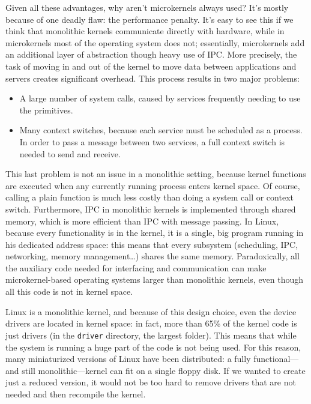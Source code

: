 Given all these advantages, why aren't microkernels always used? It's mostly because of one deadly flaw: the performance penalty. It's easy to see this if we think that monolithic kernels communicate directly with hardware, while in microkernels most of the operating system does not; essentially, microkernels add an additional layer of abstraction though heavy use of IPC. More precisely, the task of moving in and out of the kernel to move data between applications and servers creates significant overhead. This process results in two major problems:
\begin{itemize}
\item A large number of system calls, caused by services frequently needing to use the primitives.
\item Many context switches, because each service must be scheduled as a process. In order to pass a message between two services, a full context switch is needed to send and receive.
\end{itemize}
This last problem is not an issue in a monolithic setting, because kernel functions are executed when any currently running process enters kernel space. Of course, calling a plain function is much less costly than doing a system call or context switch. Furthermore, IPC in monolithic kernels is implemented through shared memory, which is more efficient than IPC with message passing. In Linux, because every functionality is in the kernel, it is a single, big program running in his dedicated address space: this means that every subsystem (scheduling, IPC, networking, memory management\dots) shares the same memory. Paradoxically, all the auxiliary code needed for interfacing and communication can make microkernel-based operating systems larger than monolithic kernels, even though all this code is not in kernel space. 

Linux is a monolithic kernel, and because of this design choice, even the device drivers are located in kernel space: in fact, more than 65\% of the kernel code is just drivers (in the \verb|driver| directory, the largest folder). This means that while the system is running a huge part of the code is not being used. For this reason, many miniaturized versions of Linux have been distributed: a fully functional---and still monolithic---kernel can fit on a single floppy disk. If we wanted to create just a reduced version, it would not be too hard to remove drivers that are not needed and then recompile the kernel. 

